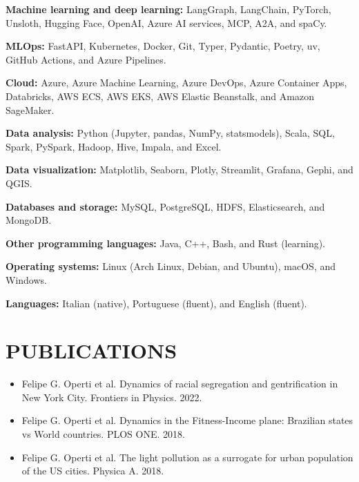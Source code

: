 \documentclass[11pt,a4paper,roman]{moderncv}        %
\begin{document}
\textbf{Machine learning and deep learning:} LangGraph, LangChain, PyTorch, Unsloth, Hugging Face, OpenAI, Azure AI services, MCP, A2A, and spaCy.

\vspace{10pt}

\textbf{MLOps:} FastAPI, Kubernetes, Docker, Git, Typer, Pydantic, Poetry, uv, GitHub Actions, and Azure Pipelines.

\vspace{10pt}

\textbf{Cloud:} Azure, Azure Machine Learning, Azure DevOps, Azure Container Apps, Databricks, AWS ECS, AWS EKS, AWS Elastic Beanstalk, and Amazon SageMaker.

\vspace{10pt}

\textbf{Data analysis:} Python (Jupyter, pandas, NumPy, statsmodels), Scala, SQL, Spark, PySpark, Hadoop, Hive, Impala, and Excel.

\vspace{10pt}

\textbf{Data visualization:} Matplotlib, Seaborn, Plotly, Streamlit, Grafana, Gephi, and QGIS.

\vspace{10pt}

\textbf{Databases and storage:} MySQL, PostgreSQL, HDFS, Elasticsearch, and MongoDB.

\vspace{10pt}

\textbf{Other programming languages:} Java, C++, Bash, and Rust (learning).

\vspace{10pt}

\textbf{Operating systems:} Linux (Arch Linux, Debian, and Ubuntu), macOS, and Windows.

\vspace{10pt}

\textbf{Languages:} Italian (native), Portuguese (fluent), and English (fluent).

\section{PUBLICATIONS}

\begin{itemize}

\item Felipe G. Operti et al. Dynamics of racial segregation and gentrification in New York City. Frontiers in Physics. 2022.

\item Felipe G. Operti et al. Dynamics in the Fitness-Income plane: Brazilian states vs World countries. PLOS ONE. 2018.

\item Felipe G. Operti et al. The light pollution as a surrogate for urban population of the US cities. Physica A. 2018.

\end{itemize}
%
\end{document}

